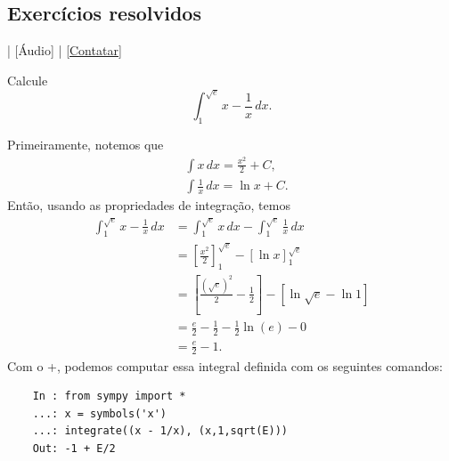 \subsection*{Exercícios resolvidos}

\begin{flushright}
  [Vídeo] | [Áudio] | \href{https://phkonzen.github.io/notas/contato.html}{[Contatar]}
\end{flushright}

\begin{exeresol}
  Calcule
  \begin{equation}
    \int_1^{\sqrt{e}} x - \frac{1}{x}\,dx.
  \end{equation}
\end{exeresol}
\begin{resol}
  Primeiramente, notemos que
  \begin{align}
    & \int x\,dx = \frac{x^2}{2} + C,\\
    & \int \frac{1}{x}\,dx = \ln x + C.
  \end{align}
  Então, usando as propriedades de integração, temos
  \begin{align}
    \int_1^{\sqrt{e}} x - \frac{1}{x}\,dx &= \int_1^{\sqrt{e}} x\,dx - \int_1^{\sqrt{e}} \frac{1}{x}\,dx \\
                                 &= \left[\frac{x^2}{2}\right]_1^{\sqrt{e}} - \left[\ln x\right]_1^{\sqrt{e}} \\
                                          &= \left[\frac{(\sqrt{e})^2}{2} - \frac{1}{2}\right] - \left[\ln\sqrt{e} - \ln 1\right]\\
                                          &= \frac{e}{2} - \frac{1}{2} - \frac{1}{2}\ln(e) - 0 \\
                                          &= \frac{e}{2} - 1.
  \end{align}
  \ifispython
  Com o {\python}+{\sympy}, podemos computar essa integral definida com os seguintes comandos:
  \begin{lstlisting}
    In : from sympy import *
    ...: x = symbols('x')
    ...: integrate((x - 1/x), (x,1,sqrt(E)))
    Out: -1 + E/2
  \end{lstlisting}
  \fi  
\end{resol}

